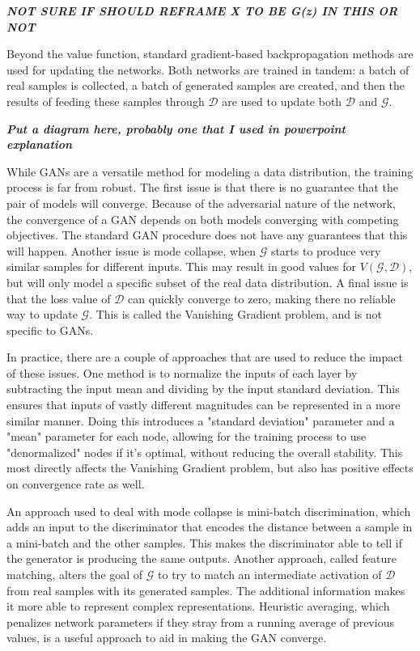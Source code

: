 	\textit{\textbf{NOT SURE IF SHOULD REFRAME X TO BE G(z) IN THIS OR NOT}}
	\par Beyond the value function, standard gradient-based backpropagation methods are used for updating the networks. Both networks are trained in tandem: a batch of real samples is collected, a batch of generated samples are created, and then the results of feeding these samples through $\mathcal{D}$ are used to update both $\mathcal{D}$ and $\mathcal{G}$.  
	\par \textit{\textbf{Put a diagram here, probably one that I used in powerpoint explanation}}
	\par While GANs are a versatile method for modeling a data distribution, the training process is far from robust. The first issue is that there is no guarantee that the pair of models will converge. Because of the adversarial nature of the network, the convergence of a GAN  depends on both models converging with competing objectives. The standard GAN procedure does not have any guarantees that this will happen. Another issue is mode collapse, when $\mathcal{G}$ starts to produce very similar samples for different inputs. This may result in good values for $V(\mathcal{G},\mathcal{D})$, but will only model a specific subset of the real data distribution. A final issue is that the loss value of $\mathcal{D}$ can quickly converge to zero, making there no reliable way to update $\mathcal{G}$. This is called the Vanishing Gradient problem, and is not specific to GANs. 
	\par In practice, there are a couple of approaches that are used to reduce the impact of these issues. One method is to normalize the inputs of each layer by subtracting the input mean and dividing by the input standard deviation. This ensures that inputs of vastly different magnitudes can be represented in a more similar manner. Doing this introduces a "standard deviation" parameter and a "mean" parameter for each node, allowing for the training process to use "denormalized" nodes if it's optimal, without reducing the overall stability. This most directly affects the Vanishing Gradient problem, but also has positive effects on convergence rate as well.
	\par An approach used to deal with mode collapse is mini-batch discrimination, which adds an input to the discriminator that encodes the distance between a sample in a mini-batch and the other samples. This makes the discriminator able to tell if the generator is producing the same outputs. Another approach, called feature matching, alters the goal of $\mathcal{G}$ to try to match an intermediate activation of $\mathcal{D}$ from real samples with its generated samples. The additional information makes it more able to represent complex representations. Heuristic averaging, which penalizes network parameters if they stray from a running average of previous values, is a useful approach to aid in making the GAN converge. 
